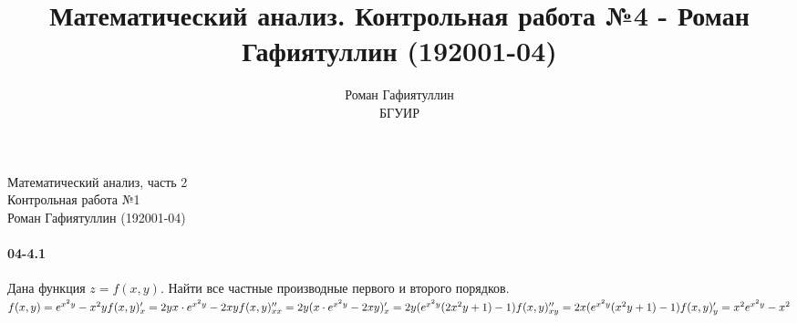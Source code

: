 \documentclass[12pt]{article}
\title{Математический анализ. Контрольная работа №4 - Роман Гафиятуллин (192001-04)}
\author{Роман Гафиятуллин\\ БГУИР}
\begin{document}
	\begin{titlepage}
		\begin{center}
			{\Large Математический анализ, часть 2 \\ Контрольная работа №1 \\ Роман Гафиятуллин (192001-04)}
		\end{center}
	\end{titlepage}
	\clearpage
	\paragraph{04-4.1} Дана функция $z = f(x,y)$. Найти все частные производные первого и второго порядков. \\
	\ensuremath{
		f(x,y) = e^{x^{2}y} - x^{2}y 
		\\ \\
		\\
		f(x,y)^{\prime}_{x} = 2 y x \cdot e^{x^{2}y} - 2xy 
		\\ \\
		f(x,y)^{\prime\prime}_{xx} = 2y ( x \cdot e^{x^{2}y} - 2xy )^{\prime}_x = 2y ( e^{x^{2}y} ( 2x^2y + 1 ) - 1 )
		\\ \\
		f(x,y)^{\prime\prime}_{xy} = 2x (e^{x^{2}y} (x^{2}y + 1) - 1) 
		\\ \\
		\\
		f(x,y)^{\prime}_{y} = x^{2} e^{x^{2}y} - x^{2} 
		\\ \\
	}

	
\end{document}
